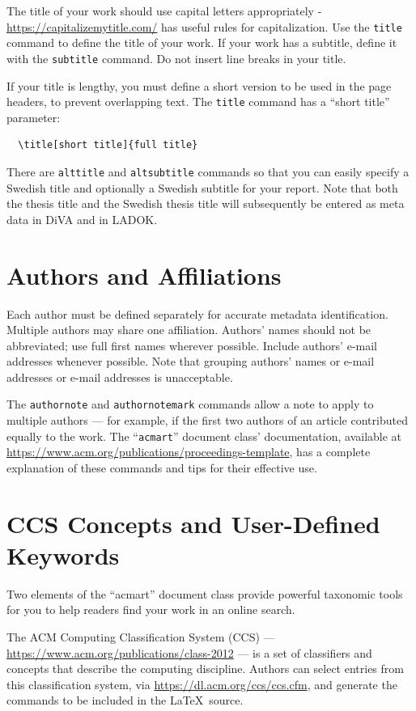 \documentclass[screen, sigcconf]{timtm}
\begin{document}
The title of your work should use capital letters appropriately -
\url{https://capitalizemytitle.com/} has useful rules for
capitalization. Use the {\verb|title|} command to define the title of
your work. If your work has a subtitle, define it with the
{\verb|subtitle|} command.  Do not insert line breaks in your title.

If your title is lengthy, you must define a short version to be used
in the page headers, to prevent overlapping text. The \verb|title|
command has a ``short title'' parameter:
\begin{verbatim}
  \title[short title]{full title}
\end{verbatim}

There are \verb|alttitle| and \verb|altsubtitle| commands so that you can easily specify a Swedish title and optionally a Swedish subtitle for your report. Note that both the thesis title and the Swedish thesis title will subsequently be entered as meta data in DiVA and in LADOK.

\section{Authors and Affiliations}

Each author must be defined separately for accurate metadata
identification. Multiple authors may share one affiliation. Authors'
names should not be abbreviated; use full first names wherever
possible. Include authors' e-mail addresses whenever possible. Note that grouping authors' names or e-mail addresses or e-mail
addresses is unacceptable.

The \verb|authornote| and \verb|authornotemark| commands allow a note
to apply to multiple authors --- for example, if the first two authors
of an article contributed equally to the work. The ``\verb|acmart|'' document class'  documentation, available at
\url{https://www.acm.org/publications/proceedings-template}, has a
complete explanation of these commands and tips for their effective
use.

\section{CCS Concepts and User-Defined Keywords}

Two elements of the ``acmart'' document class provide powerful
taxonomic tools for you to help readers find your work in an online
search.

The ACM Computing Classification System  (CCS) ---
\url{https://www.acm.org/publications/class-2012} --- is a set of
classifiers and concepts that describe the computing
discipline. Authors can select entries from this classification
system, via \url{https://dl.acm.org/ccs/ccs.cfm}, and generate the
commands to be included in the \LaTeX\ source.
\end{document}
